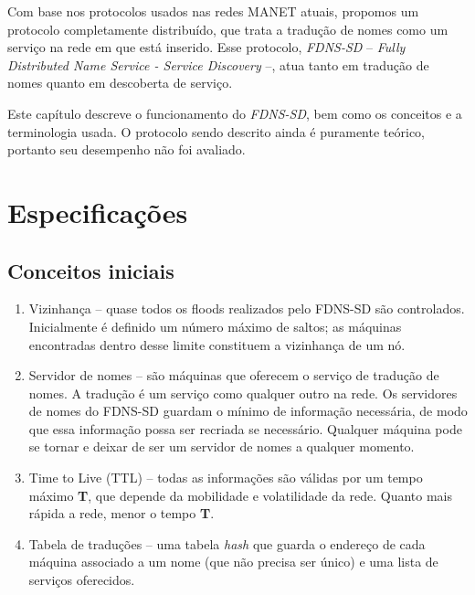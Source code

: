 
Com base nos protocolos usados nas redes MANET atuais, propomos um protocolo
completamente distribuído, que trata a tradução de nomes como um serviço na rede
em que está inserido. Esse protocolo, \textit{FDNS-SD} -- 
\textit{Fully Distributed Name Service - Service Discovery} --, atua tanto em
tradução de nomes quanto em descoberta de serviço.

Este capítulo descreve o funcionamento do \textit{FDNS-SD}, bem como os conceitos
e a terminologia usada. O protocolo sendo descrito ainda é puramente teórico,
portanto seu desempenho não foi avaliado.

\section{Especificações}
    \subsection{Conceitos iniciais}
        \begin{enumerate}
            \item Vizinhança -- quase todos os floods realizados pelo FDNS-SD são
            controlados. Inicialmente é definido um número máximo de saltos; as
            máquinas  encontradas dentro desse limite constituem a vi\-zi\-nhan\-ça
            de um nó.
            \item Servidor de nomes -- são máquinas que oferecem o serviço de
            tradução de nomes. A tradução é um serviço como qualquer outro na rede.
            Os servidores de nomes do FDNS-SD guardam o mínimo de informação
            necessária, de modo que essa informação possa ser recriada se necessário.
            Qualquer máquina pode se tornar e deixar de ser um servidor de nomes
            a qualquer momento.
            \item Time to Live (TTL) -- todas as informações são válidas por um 
            tempo máximo \textbf{T}, que depende da mobilidade e volatilidade da
            rede. Quanto mais rápida a rede, menor o tempo \textbf{T}.
            \item Tabela de traduções -- uma tabela \textit{hash} que guarda o
            endereço de cada máquina associado a um nome (que não precisa ser único)
            e uma lista de serviços oferecidos.
        \end{enumerate}
        
